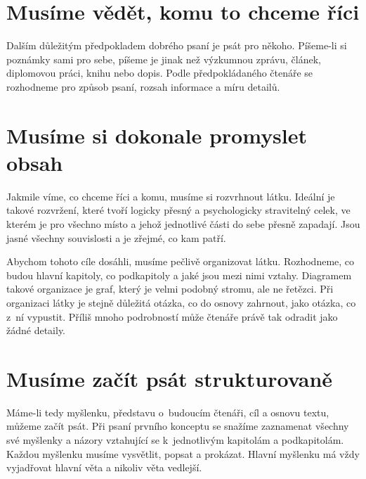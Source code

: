 \section{Musíme vědět, komu to chceme říci}
Dalším důležitým předpokladem dobrého psaní je psát pro někoho.
Píšeme-li si poznámky sami pro sebe, píšeme je jinak než výzkumnou zprávu, článek, diplomovou práci, knihu nebo dopis.
Podle předpokládaného čtenáře se rozhodneme pro způsob psaní, rozsah informace a míru detailů.

\section{Musíme si dokonale promyslet obsah}
Jakmile víme, co chceme říci a komu, musíme si rozvrhnout látku.
Ideální je takové rozvržení, které tvoří logicky přesný a psychologicky stravitelný celek, ve kterém je pro všechno místo a jehož jednotlivé části do sebe přesně zapadají.
Jsou jasné všechny souvislosti a je zřejmé, co kam patří.

Abychom tohoto cíle dosáhli, musíme pečlivě organizovat látku.
Rozhodneme, co budou hlavní kapitoly, co podkapitoly a jaké jsou mezi nimi vztahy.
Diagramem takové organizace je graf, který je velmi podobný stromu, ale ne řetězci.
Při organizaci látky je stejně důležitá otázka, co do osnovy zahrnout, jako otázka, co z~ní vypustit.
Příliš mnoho podrobností může čtenáře právě tak odradit jako žádné detaily.

\section{Musíme začít psát strukturovaně}
Máme-li tedy myšlenku, představu o~budoucím čtenáři, cíl a osnovu textu, můžeme začít psát.
Při psaní prvního konceptu se snažíme zaznamenat všechny své myšlenky a názory vztahující se k~jednotlivým kapitolám a podkapitolám.
Každou myšlenku musíme vysvětlit, popsat a prokázat.
Hlavní myšlenku má vždy vyjadřovat hlavní věta a nikoliv věta vedlejší.
